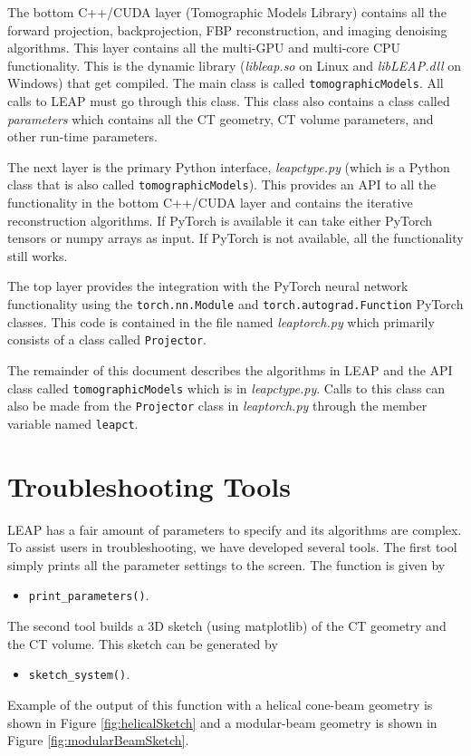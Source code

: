 \documentclass[11pt]{article}
\begin{document}
The bottom C++/CUDA layer (Tomographic Models Library) contains all the forward projection, backprojection, FBP reconstruction, and imaging denoising algorithms.  This layer contains all the multi-GPU and multi-core CPU functionality.  This is the dynamic library (\textit{libleap.so} on Linux and \textit{libLEAP.dll} on Windows) that get compiled.  The main class is called \texttt{tomographicModels}.  All calls to LEAP must go through this class.  This class also contains a class called \textit{parameters} which contains all the CT geometry, CT volume parameters, and other run-time parameters.

The next layer is the primary Python interface, \textit{leapctype.py} (which is a Python class that is also called \texttt{tomographicModels}).  This provides an API to all the functionality in the bottom C++/CUDA layer and contains the iterative reconstruction algorithms.  If PyTorch is available it can take either PyTorch tensors or numpy arrays as input.  If PyTorch is not available, all the functionality still works.

The top layer provides the integration with the PyTorch neural network functionality using the \texttt{torch.nn.Module} and \texttt{torch.autograd.Function} PyTorch classes.  This code is contained in the file named \textit{leaptorch.py} which primarily consists of a class called \texttt{Projector}.  

The remainder of this document describes the algorithms in LEAP and the API class called \texttt{tomographicModels} which is in \textit{leapctype.py}.  Calls to this class can also be made from the \texttt{Projector} class in \textit{leaptorch.py} through the member variable named \texttt{leapct}.

\section{Troubleshooting Tools}

LEAP has a fair amount of parameters to specify and its algorithms are complex.  To assist users in troubleshooting, we have developed several tools.  The first tool simply prints all the parameter settings to the screen.  The function is given by
\begin{itemize}
    \item[] \texttt{print\_parameters()}.
\end{itemize}
The second tool builds a 3D sketch (using matplotlib) of the CT geometry and the CT volume.  This sketch can be generated by
\begin{itemize}
    \item[] \texttt{sketch\_system()}.
\end{itemize}
Example of the output of this function with a helical cone-beam geometry is shown in Figure \ref{fig:helicalSketch} and a modular-beam geometry is shown in Figure \ref{fig:modularBeamSketch}.
\end{document}
